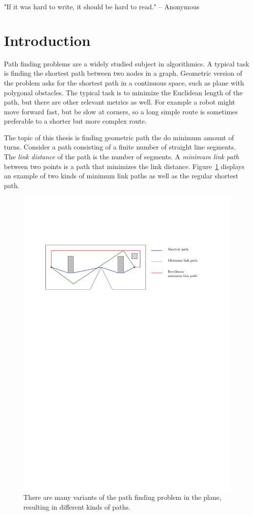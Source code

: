 \documentclass[english,gradu]{tktltiki2018}
\begin{document}
"If it was hard to write, it should be hard to read." -- Anonymous

\section{Introduction}

Path finding problems are a widely studied subject in algorithmics.\cite{survey}
A typical task is finding the shortest path between two nodes in a graph.
Geometric version of the problem asks for the shortest path in a continuous space, such as plane with polygonal obstacles.
The typical task is to minimize the Euclidean length of the path, but there are other relevant metrics as well.
For example a robot might move forward fast, but be slow at corners, so a long simple route is sometimes preferable to a shorter but more complex route.

The topic of this thesis is finding geometric path the do minimum amount of turns.
Consider a path consisting of a finite number of straight line segments.
The \emph{link distance} of the path is the number of segments.
A \emph{minimum link path} between two points is a path that minimizes the link distance.
Figure~\ref{fig:paths} displays an example of two kinds of minimum link paths as well as the regular shortest path.

\begin{figure}\centering
	\includegraphics{fig/paths}
	\caption{There are many variants of the path finding problem in the plane, resulting in different kinds of paths.}\label{fig:paths}
\end{figure}
\end{document}
